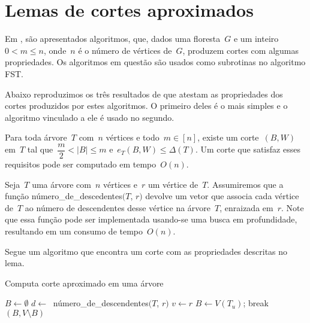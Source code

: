 \section {Lemas de cortes aproximados}

Em \cite{Schmidt15}, são apresentados 
algoritmos, que, dados uma floresta~$G$ e um 
inteiro~${0<m\le n}$, onde~$n$ é o número de vértices de~$G$, 
produzem cortes com algumas propriedades.
Os algoritmos em questão são usados como subrotinas no algoritmo
FST.

Abaixo reproduzimos os três resultados de \cite{Schmidt15} que 
atestam as propriedades dos cortes produzidos por estes algoritmos.
O primeiro deles é o mais simples e o algoritmo vinculado a ele
é usado no segundo.

\bigskip

\begin{lem}[]
\label{lema:simpleApproxCutTree}
	Para toda árvore~$T$ com~$n$ vértices e todo~${m \in [n]}$,
	existe um corte~$(B,W)$ em~$T$ tal 
	que~${\dfrac{m}{2} <|B| \le m}$ e~${e_T(B,W) \le \Delta(T)}$.
	Um corte que satisfaz esses requisitos pode ser computado em
	tempo~$O(n)$.
\end{lem}

\bigskip

Seja~$T$ uma árvore com~$n$ vértices e~$r$ um vértice de~$T$. 
Assumiremos que
a função {\sc número\_de\_descedentes}$(T$, $r)$ devolve um vetor
que associa cada vértice de~$T$ ao número de descendentes desse 
vértice na árvore~$T$, enraizada em~$r$. Note que essa função 
pode ser implementada usando-se uma busca em profundidade,
resultando em um consumo de tempo~$O(n)$.


Segue um algoritmo que encontra um corte com as propriedades 
descritas no lema.

\medskip

\begin{algorithm}[H]
\label{alg:simpleApproxCutTree}

	\caption{Computa corte aproximado em uma árvore}
	$B \gets \emptyset$\;
		$d \gets~$ {\sc número\_de\_descendentes}$(T$, $r)$\;
		$v \gets r$\;
		{
			$B\gets V(T_u)$; \quad
		}
		{
		{
			{
				break\;
			}
		}
		}
	\Return $(B,V\setminus B)$

\end{algorithm}	

